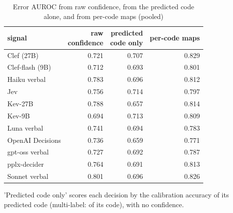 \begin{table}[t]
\centering
\small
\caption{Error AUROC from raw confidence, from the predicted code alone, and from per-code maps (pooled)}
\label{tab:tab22_category_only}
\begin{adjustbox}{max width=\linewidth}
\begin{tabular}{lrrr}
\toprule
signal & \makecell[br]{raw \\{} confidence} & \makecell[br]{predicted \\{} code only} & per-code maps \\
\midrule
Clef (27B) & 0.721 & 0.707 & 0.829 \\
Clef-flash (9B) & 0.712 & 0.693 & 0.801 \\
Haiku verbal & 0.783 & 0.696 & 0.812 \\
Jev & 0.756 & 0.714 & 0.797 \\
Kev-27B & 0.788 & 0.657 & 0.814 \\
Kev-9B & 0.694 & 0.713 & 0.809 \\
Luna verbal & 0.741 & 0.694 & 0.783 \\
OpenAI Decisions & 0.736 & 0.659 & 0.771 \\
gpt-oss verbal & 0.727 & 0.692 & 0.787 \\
pplx-decider & 0.764 & 0.691 & 0.813 \\
Sonnet verbal & 0.801 & 0.696 & 0.826 \\
\bottomrule
\end{tabular}
\end{adjustbox}
\par\smallskip\footnotesize\raggedright 'Predicted code only' scores each decision by the calibration accuracy of its predicted code (multi-label: of its code), with no confidence.
\end{table}
